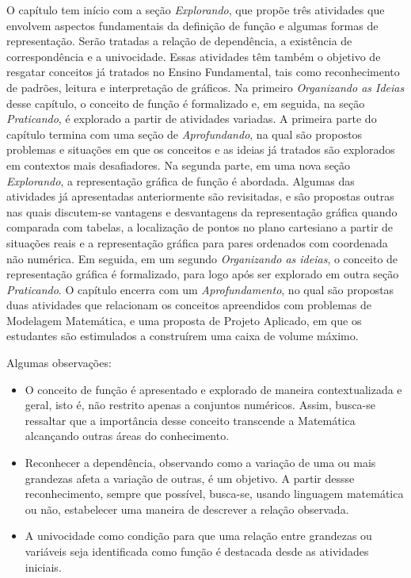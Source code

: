\begin{apresentacao}
O capítulo tem início com a seção \textit{Explorando}, que propõe três atividades que envolvem aspectos fundamentais da definição de função e algumas formas de representação. Serão tratadas a relação de dependência, a existência de correspondência e a univocidade. Essas atividades têm também o objetivo de resgatar conceitos já tratados no Ensino Fundamental, tais como reconhecimento de padrões, leitura e interpretação de gráficos. Na primeiro \textit{Organizando as Ideias} desse capítulo, o conceito de função é formalizado e, em seguida, na seção \textit{Praticando}, é explorado a partir de atividades variadas.  A primeira parte do capítulo termina com uma seção de \textit{Aprofundando}, na qual são propostos problemas e situações em que os conceitos e as ideias já tratados são explorados em contextos mais desafiadores. Na segunda parte, em uma nova seção \textit{Explorando}, a representação gráfica de função é abordada. Algumas das atividades já apresentadas anteriormente são revisitadas, e são propostas outras nas quais discutem-se vantagens e desvantagens da representação gráfica quando comparada com tabelas, a localização de pontos no plano cartesiano a partir de situações reais e a representação gráfica para pares ordenados com coordenada não numérica. Em seguida, em um segundo \textit{Organizando as ideias}, o conceito de representação gráfica é formalizado, para logo após ser explorado em outra seção \textit{Praticando}. O capítulo encerra com um \textit{Aprofundamento}, no qual são propostas duas atividades que relacionam os conceitos apreendidos com problemas de Modelagem Matemática, e uma proposta de Projeto Aplicado, em que os estudantes são estimulados a construírem uma caixa de volume máximo.

Algumas observações:
\begin{itemize}
\item {} 
O conceito de função é apresentado e explorado de maneira contextualizada e geral, isto é, não restrito apenas a conjuntos numéricos. Assim, busca-se ressaltar que a importância desse conceito transcende a Matemática alcançando outras áreas do conhecimento.

\item {} 
Reconhecer a dependência, observando como a variação de uma ou mais grandezas afeta        a variação de outras, é um objetivo. A partir dessse reconhecimento, sempre que possível, busca-se, usando linguagem matemática ou não, estabelecer uma maneira de descrever a relação observada.

\item {} 
A univocidade como condição para que uma relação entre grandezas ou variáveis seja identificada como função é destacada desde as atividades iniciais.


\end{itemize}
\end{apresentacao}
